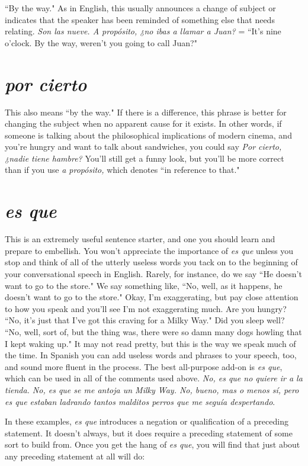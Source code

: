 ``By the way." As in English, this usually announces a change
of subject or indicates that the speaker has been reminded of something else that needs relating. \emph{Son las nueve. A propósito, ¿no ibas a
llamar a Juan?} = ``It's nine o'clock. By the way, weren't you going to
call Juan?"

\section{\emph{por cierto}}

This also means ``by the way." If there is a difference, this
phrase is better for changing the subject when no apparent cause for
it exists. In other words, if someone is talking about the philosophical
implications of modern cinema, and you're hungry and want to talk
about sandwiches, you could say \emph{Por cierto, ¿nadie tiene hambre?}
You'll still get a funny look, but you'll be more correct than if you use
\emph{a propósito,} which denotes ``in reference to that."

\section{\emph{es que}}

This is an extremely useful sentence starter, and one you
should learn and prepare to embellish. You won't appreciate the importance of \emph{es que} unless you stop and think of all of the utterly useless
words you tack on to the beginning of your conversational speech in
English. Rarely, for instance, do we say ``He doesn't want to go to the
store." We say something like, ``No, well, as it happens, he doesn't
want to go to the store." Okay, I'm exaggerating, but pay close attention to how you speak and you'll see I'm not exaggerating much. Are
you hungry? ``No, it's just that I've got this craving for a Milky Way."
Did you sleep well? ``No, well, sort of, but the thing was, there were
so damn many dogs howling that I kept waking up." It may not read
pretty, but this is the way we speak much of the time. In Spanish you
can add useless words and phrases to your speech, too, and sound more
fluent in the process. The best all-purpose add-on is \emph{es que}, which can
be used in all of the comments used above. \emph{No, es que no quiere ir a
la tienda. No, es que se me antoja un Milky Way. No, bueno, mas o
menos sí, pero es que estaban ladrando tantos malditos perros que
me seguía despertando}.

In these examples, \emph{es que} introduces a negation or qualification of a preceding statement. It doesn't always, but it does require a preceding statement of some sort to build from. Once you get the hang of \emph{es
que}, you will find that just about any preceding statement at all will do:

